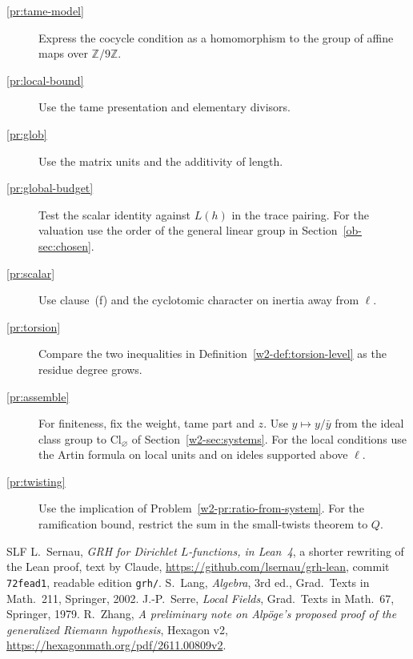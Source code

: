 \documentclass[reqno]{amsart}
\theoremstyle{definition}
\theoremstyle{plain}
\theoremstyle{remark}
\newcommand{\Z}{\mathbb Z}
\begin{document}
\begin{description}
\item[\ref{pr:tame-model}] Express the cocycle condition as a homomorphism to the group of affine maps over \(\Z/9\Z\).
\item[\ref{pr:local-bound}] Use the tame presentation and elementary divisors.
\item[\ref{pr:glob}] Use the matrix units and the additivity of length.
\item[\ref{pr:global-budget}] Test the scalar identity against \(L(h)\) in the trace pairing.  For the valuation use the order of the general linear group in Section~\ref{ob-sec:chosen}.
\item[\ref{pr:scalar}] Use clause~(f) and the cyclotomic character on inertia away from \(\ell\).
\item[\ref{pr:torsion}] Compare the two inequalities in Definition~\ref{w2-def:torsion-level} as the residue degree grows.
\item[\ref{pr:assemble}] For finiteness, fix the weight, tame part and \(z\).  Use \(y\mapsto y/\bar y\) from the ideal class group to \(\mathrm{Cl}_\varnothing\) of Section~\ref{w2-sec:systems}.  For the local conditions use the Artin formula on local units and on ideles supported above \(\ell\).
\item[\ref{pr:twisting}] Use the implication of Problem~\ref{w2-pr:ratio-from-system}.  For the ramification bound, restrict the sum in the small-twists theorem to \(Q\).
\end{description}

\begin{thebibliography}{SLF}
 L.~Sernau, \emph{GRH for Dirichlet \(L\)-functions, in Lean~4}, a shorter rewriting of the Lean proof, text by Claude, \url{https://github.com/lsernau/grh-lean}, commit \texttt{72fead1}, readable edition \texttt{grh/}.
 S.~Lang, \emph{Algebra}, 3rd ed., Grad.\ Texts in Math.\ 211, Springer, 2002.
 J.-P.~Serre, \emph{Local Fields}, Grad.\ Texts in Math.\ 67, Springer, 1979.
 R.~Zhang, \emph{A preliminary note on Alp\"oge's proposed proof of the generalized Riemann hypothesis}, Hexagon v2, \url{https://hexagonmath.org/pdf/2611.00809v2}.
\end{thebibliography}
\end{document}
